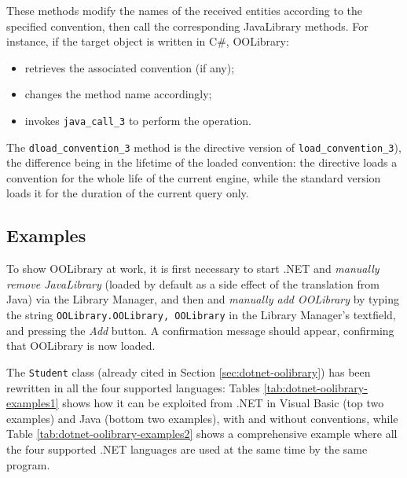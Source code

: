 \noindent These methods modify the names of the received entities according to the specified convention, then call the corresponding JavaLibrary methods.
For instance, if the target object is written in C\#, OOLibrary:
\begin{itemize}
  \item retrieves the associated convention (if any);
  \item changes the method name accordingly;
  \item invokes \texttt{java\_call\_3} to perform the operation.
\end{itemize}

\noindent The \texttt{dload\_convention\_3} method is the directive version of \texttt{load\_convention\_3}), the difference being in the lifetime of the loaded convention: the directive loads a convention for the whole life of the current \tuprolog{} engine, while the standard version loads it for the duration of the current query only.

\subsection{Examples}
\label{sec:dotnet-oolibrary-examples}

To show OOLibrary at work, it is first necessary to start \tuprolog{}.NET and \textit{manually remove JavaLibrary} (loaded by default as a side effect of the translation from Java) via the Library Manager, and then and \textit{manually add OOLibrary} by typing the string \texttt{OOLibrary.OOLibrary, OOLibrary} in the Library Manager's textfield, and pressing the \textit{Add} button.
A confirmation message should appear, confirming that OOLibrary is now loaded.

The \texttt{Student} class (already cited in Section \ref{sec:dotnet-oolibrary}) has been rewritten in all the four supported languages:
Tables \ref{tab:dotnet-oolibrary-examples1} shows how it can be exploited from \tuprolog{}.NET in Visual Basic (top two examples) and Java (bottom two examples), with and without conventions, while Table \ref{tab:dotnet-oolibrary-examples2} shows a comprehensive example where all the four supported .NET languages are used at the same time by the same \tuprolog{} program.

